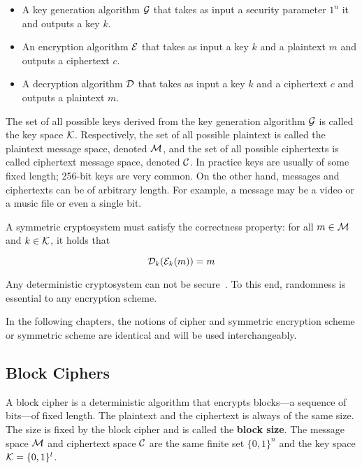 \begin{itemize}
  \item A key generation algorithm $\mathcal{G}$ that takes as input a security parameter $1^{n}$ it and outputs a key $k$.
  \item An encryption algorithm $\mathcal{E}$ that takes as input a key $k$ and a plaintext $m$ and outputs a ciphertext $c$.
  \item A decryption algorithm $\mathcal{D}$ that takes as input a key $k$ and a ciphertext $c$ and outputs a plaintext $m$.
\end{itemize}

The set of all possible keys derived from the key generation algorithm $\mathcal{G}$ is called the key space $\mathcal{K}$. Respectively, the set of all possible plaintext is called the plaintext message space, denoted $\mathcal{M}$, and the set of all possible ciphertexts is called ciphertext message space, denoted $\mathcal{C}$. In practice keys are usually of some fixed length; 256-bit keys are very common. On the other hand, messages and ciphertexts can be of arbitrary length. For example, a message may be a video or a music file or even a single bit.

A symmetric cryptosystem must satisfy the correctness property: for all $m \in \mathcal{M}$ and $k \in \mathcal{K}$, it holds that

\begin{equation*}
  \mathcal{D}_{k}(\mathcal{E}_{k}(m)) = m
\end{equation*}

Any deterministic cryptosystem can not be secure~\cite{Katz:2014:IMC:2700550, kiagias:crypto}. To this end, randomness is essential to any encryption scheme.

In the following chapters, the notions of cipher and symmetric encryption scheme or symmetric scheme are identical and will be used interchangeably.

\subsection{Block Ciphers}
\label{preliminaries:sym:block}

A block cipher is a deterministic algorithm that encrypts blocks---a sequence of bits---of fixed length. The plaintext and the ciphertext is always of the same size. The size is fixed by the block cipher and is called the \textbf{block size}. The message space $\mathcal{M}$ and ciphertext space $\mathcal{C}$ are the same finite set $\{ 0, 1\}^{n}$ and the key space $\mathcal{K} = \{ 0, 1\}^{l}$.

